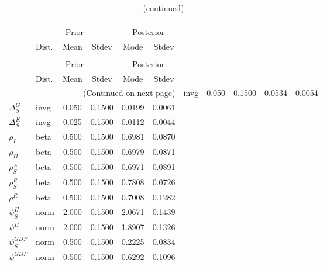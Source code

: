  
\begin{center}
\begin{longtable}{llcccc} 
\caption{Results from posterior maximization (parameters)}\\
 \label{Table:Posterior:1}\\
\toprule 
  & \multicolumn{3}{c}{Prior}  &  \multicolumn{2}{c}{Posterior} \\
  \cmidrule(r{.75em}){2-4} \cmidrule(r{.75em}){5-6}
  & Dist. & Mean  & Stdev & Mode & Stdev \\ 
\midrule \endfirsthead 
\caption{(continued)}\\
 \bottomrule 
  & \multicolumn{3}{c}{Prior}  &  \multicolumn{2}{c}{Posterior} \\
  \cmidrule(r{.75em}){2-4} \cmidrule(r{.75em}){5-6}
  & Dist. & Mean  & Stdev & Mode & Stdev \\ 
\midrule \endhead 
\bottomrule \multicolumn{6}{r}{(Continued on next page)}\endfoot 
\bottomrule\endlastfoot 
${\Delta^{A}_{S}}$ & invg &   0.050 & 0.1500 &   0.0534 &  0.0054 \\ 
${\Delta^{G}_{S}}$ & invg &   0.050 & 0.1500 &   0.0199 &  0.0061 \\ 
${\Delta^{K}_{S}}$ & invg &   0.025 & 0.1500 &   0.0112 &  0.0044 \\ 
${\rho_{I}}$ & beta &   0.500 & 0.1500 &   0.6981 &  0.0870 \\ 
${\rho_{II}}$ & beta &   0.500 & 0.1500 &   0.6979 &  0.0871 \\ 
${\rho^{A}_{S}}$ & beta &   0.500 & 0.1500 &   0.6971 &  0.0891 \\ 
${\rho^{R}_{S}}$ & beta &   0.500 & 0.1500 &   0.7808 &  0.0726 \\ 
${\rho^{R}}$ & beta &   0.500 & 0.1500 &   0.7008 &  0.1282 \\ 
${\psi^{\Pi}_{S}}$ & norm &   2.000 & 0.1500 &   2.0671 &  0.1439 \\ 
${\psi^{\Pi}}$ & norm &   2.000 & 0.1500 &   1.8907 &  0.1326 \\ 
${\psi^{GDP}_{S}}$ & norm &   0.500 & 0.1500 &   0.2225 &  0.0834 \\ 
${\psi^{GDP}}$ & norm &   0.500 & 0.1500 &   0.6292 &  0.1096 \\ 
\end{longtable}
 \end{center}
